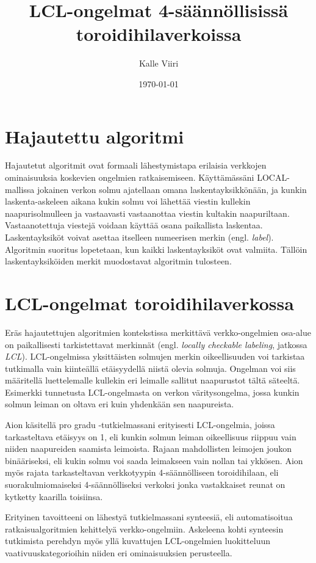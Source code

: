 \documentclass[12pt,finnish]{tktltiki2}
\title{LCL-ongelmat 4-säännöllisissä toroidihilaverkoissa}
\author{Kalle Viiri}
\date{\today}
\theoremstyle{definition}
\theoremstyle{remark}
\begin{document}


\mainmatter       %

\section{Hajautettu algoritmi}

Hajautetut algoritmit ovat formaali lähestymistapa erilaisia verkkojen ominaisuuksia koskevien ongelmien ratkaisemiseen. Käyttämässäni LOCAL-mallissa jokainen verkon solmu ajatellaan omana laskentayksikkönään, ja kunkin laskenta-askeleen aikana kukin solmu voi lähettää viestin kullekin naapurisolmulleen ja vastaavasti vastaanottaa viestin kultakin naapuriltaan. Vastaanotettuja viestejä voidaan käyttää osana paikallista laskentaa. Laskentayksiköt voivat asettaa itselleen numeerisen merkin (engl. \textit{label}). Algoritmin suoritus lopetetaan, kun kaikki laskentayksiköt ovat valmiita. Tällöin laskentayksiköiden merkit muodostavat algoritmin tulosteen.

\section{LCL-ongelmat toroidihilaverkossa}

Eräs hajautettujen algoritmien kontekstissa merkittävä verkko-ongelmien osa-alue on paikallisesti tarkistettavat merkinnät (engl. \textit{locally checkable labeling}, jatkossa \textit{LCL}). LCL-ongelmissa yksittäisten solmujen merkin oikeellisuuden voi tarkistaa tutkimalla vain kiinteällä etäisyydellä niistä olevia solmuja. Ongelman voi siis määritellä luettelemalle kullekin eri leimalle sallitut naapurustot tältä säteeltä. Esimerkki tunnetusta LCL-ongelmasta on verkon väritysongelma, jossa kunkin solmun leiman on oltava eri kuin yhdenkään sen naapureista.

Aion käsitellä pro gradu -tutkielmassani erityisesti LCL-ongelmia, joissa tarkasteltava etäisyys on 1, eli kunkin solmun leiman oikeellisuus riippuu vain niiden naapureiden saamista leimoista. Rajaan mahdollisten leimojen joukon binääriseksi, eli kukin solmu voi saada leimakseen vain nollan tai ykkösen. Aion myös rajata tarkasteltavan verkkotyypin 4-säännölliseen toroidihilaan, eli suorakulmiomaiseksi 4-säännölliseksi verkoksi jonka vastakkaiset reunat on kytketty kaarilla toisiinsa.

Erityinen tavoitteeni on lähestyä tutkielmassani synteesiä, eli automatisoitua ratkaisualgoritmien kehittelyä verkko-ongelmiin. Askeleena kohti synteesin tutkimista perehdyn myös yllä kuvattujen LCL-ongelmien luokitteluun vaativuuskategorioihin niiden eri ominaisuuksien perusteella.
\end{document}
